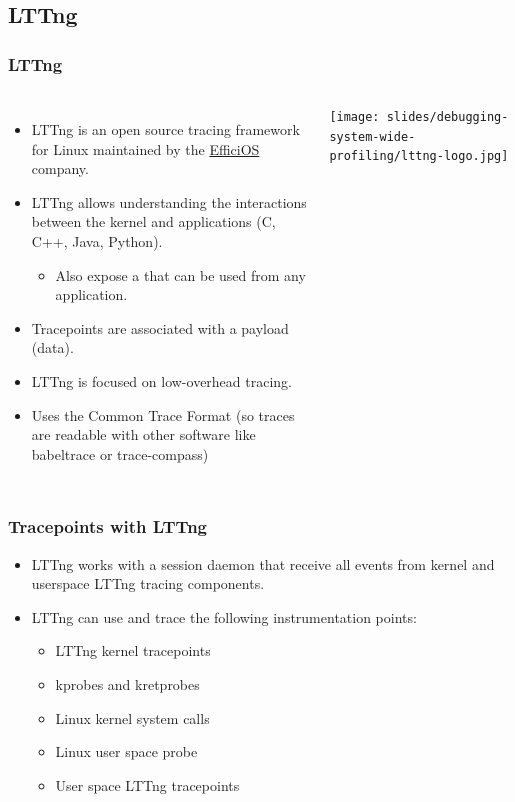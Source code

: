 \subsection{LTTng}

\begin{frame}
  \frametitle{LTTng}
  \begin{columns}
    \begin{itemize}
      \item LTTng is an open source tracing framework for Linux maintained by
            the \href{https://www.efficios.com/}{EfficiOS} company.
      \item LTTng allows understanding the interactions between the kernel and
            applications (C, C++, Java, Python).
      \begin{itemize}
        \item Also expose a  that can be used from any
              application.
      \end{itemize}
      \item Tracepoints are associated with a payload (data).
      \item LTTng is focused on low-overhead tracing.
      \item Uses the Common Trace Format (so traces are readable with other
      software like babeltrace or trace-compass)
    \end{itemize}
    \texttt{[image: slides/debugging-system-wide-profiling/lttng-logo.jpg]}
  \end{columns}
\end{frame}

\begin{frame}
  \frametitle{Tracepoints with LTTng}
  \begin{itemize}
    \item LTTng works with a session daemon that receive all events from kernel
          and userspace LTTng tracing components.
    \item LTTng can use and trace the following instrumentation points:
    \begin{itemize}
      \item LTTng kernel tracepoints
      \item kprobes and kretprobes
      \item Linux kernel system calls
      \item Linux user space probe
      \item User space LTTng tracepoints
    \end{itemize}
  \end{itemize}
\end{frame}

